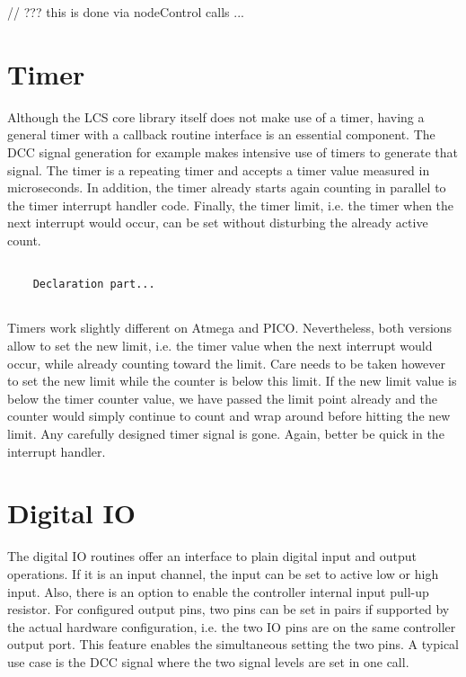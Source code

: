 // ??? this is done via nodeControl calls ...


\section{Timer}

Although the LCS core library itself does not make use of a timer, having a general timer with a callback routine interface is an essential component. The DCC signal generation for example makes intensive use of timers to generate that signal. The timer is a repeating timer and accepts a timer value measured in microseconds. In addition, the timer already starts again counting in parallel to the timer interrupt handler code. Finally, the timer limit, i.e. the timer when the next interrupt would occur, can be set without disturbing the already active count.

\lstset{language=c++, style=codesnippetstyle}
\begin{lstlisting}
   
    Declaration part...
    
\end{lstlisting}

Timers work slightly different on Atmega and PICO. Nevertheless, both versions allow to set the new limit, i.e. the timer value when the next interrupt would occur, while already counting toward the limit. Care needs to be taken however to set the new limit while the counter is below this limit. If the new limit value is below the timer counter value, we have passed the limit point already and the counter would simply continue to count and wrap around before hitting the new limit. Any carefully designed timer signal is gone. Again, better be quick in the interrupt handler.

\section{Digital IO}

The digital IO routines offer an interface to plain digital input and output operations. If it is an input channel, the input can be set to active low or high input. Also, there is an option to enable the controller internal input pull-up resistor. For configured output pins, two pins can be set in pairs if supported by the actual hardware configuration, i.e. the two IO pins are on the same controller output port. This feature enables the simultaneous setting the two pins. A typical use case is the DCC signal where the two signal levels are set in one call.

